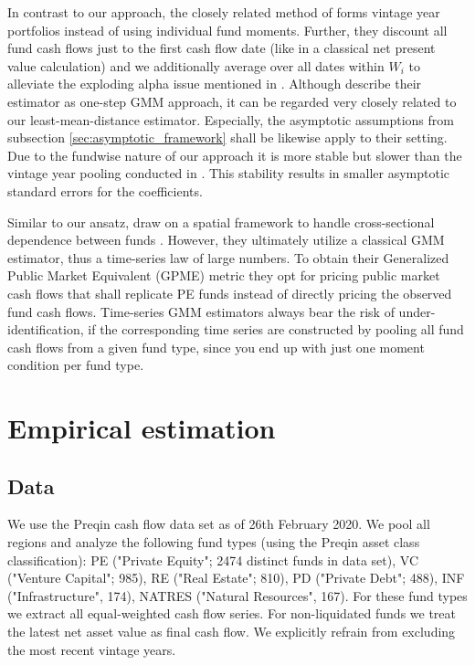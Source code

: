 \documentclass[12pt]{article}
\begin{document}
In contrast to our approach, the closely related method of \cite{DLP12} forms vintage year portfolios instead of using individual fund moments.
Further, they discount all fund cash flows just to the first cash flow date (like in a classical net present value calculation) and we additionally average over all dates within $W_{i}$ to alleviate the exploding alpha issue mentioned in \cite{DLP12}.
Although \cite{DLP12} describe their estimator as one-step GMM approach, it can be regarded very closely related to our least-mean-distance estimator.
Especially, the asymptotic assumptions from subsection \ref{sec:asymptotic_framework} shall be likewise apply to their setting.
Due to the fundwise nature of our approach it is more stable but slower than the vintage year pooling conducted in \cite{DLP12}.
This stability results in smaller asymptotic standard errors for the coefficients.

Similar to our ansatz, \cite{KN16} draw on a spatial framework to handle cross-sectional dependence between funds \citep{C99}.
However, they ultimately utilize a classical GMM estimator, thus a time-series law of large numbers.
To obtain their Generalized Public Market Equivalent (GPME) metric they opt for pricing public market cash flows that shall replicate PE funds instead of directly pricing the observed fund cash flows.
Time-series GMM estimators always bear the risk of under-identification, if the corresponding time series are constructed by pooling all fund cash flows from a given fund type, since you end up with just one moment condition per fund type.


\section{Empirical estimation}
\label{sec:empirical_estimation}

\subsection{Data}

We use the Preqin cash flow data set as of 26th February 2020.
We pool all regions and analyze the following fund types (using the Preqin asset class classification):
PE ("Private Equity"; 2474 distinct funds in data set),
VC ("Venture Capital"; 985),
RE ("Real Estate"; 810),
PD ("Private Debt"; 488),
INF ("Infrastructure", 174), 
NATRES ("Natural Resources", 167).
For these fund types we extract all equal-weighted cash flow series.
For non-liquidated funds we treat the latest net asset value as final cash flow.
We explicitly refrain from excluding the most recent vintage years.
\end{document}
